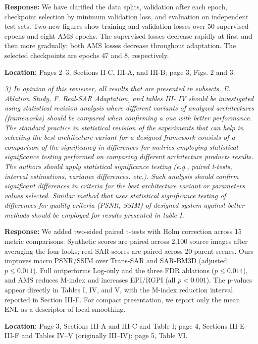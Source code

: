 \documentclass[11pt,letterpaper]{article}
\begin{document}
\textbf{Response:} We have clarified the data splits, validation after each epoch, checkpoint selection by minimum validation loss, and evaluation on independent test sets. Two new figures show training and validation losses over 50 supervised epochs and eight AMS epochs. The supervised losses decrease rapidly at first and then more gradually; both AMS losses decrease throughout adaptation. The selected checkpoints are epochs 47 and 8, respectively.

\textbf{Location:} Pages 2--3, Sections II-C, III-A, and III-B; page 3, Figs. 2 and 3.

\clearpage
\textit{3) In opinion of this reviewer, all results that are presented in subsects. E. Ablation Study, F. Real-SAR Adaptation, and tables III- IV should be investigated using statistical revision analysis where different variants of analyzed architectures (frameworks) should be compared when confirming a one with better performance. The standard practice in statistical revision of the experiments that can help in selecting the best architecture variant for a designed framework consists of a comparison of the significancy in differences for metrics employing statistical significance testing performed on comparing different architecture products\textasciiacute{} results. The authors should apply statistical significance testing (e.g., paired t-tests, interval estimations, variance differences. etc.). Such analysis should confirm significant differences in criteria for the best architecture variant or parameters\textasciiacute{} values selected. Similar method that uses statistical significance testing of differences for quality criteria (PSNR, SSIM) of designed system against better methods should be employed for results presented in table I.}

\medskip
\textbf{Response:} We added two-sided paired t-tests with Holm correction across 15 metric comparisons. Synthetic scores are paired across 2,100 source images after averaging the four looks; real-SAR scores are paired across 20 parent scenes. Ours improves macro PSNR/SSIM over Trans-SAR and SAR-BM3D (adjusted $p\leq0.011$). Full outperforms Log-only and the three FDR ablations ($p\leq0.014$), and AMS reduces M-index and increases EPI/RGPI (all $p<0.001$). The p-values appear directly in Tables I, IV, and V, with the M-index reduction interval reported in Section III-F. For compact presentation, we report only the mean ENL as a descriptor of local smoothing.

\textbf{Location:} Page 3, Sections III-A and III-C and Table I; page 4, Sections III-E--III-F and Tables IV--V (originally III--IV); page 5, Table VI.
\end{document}
